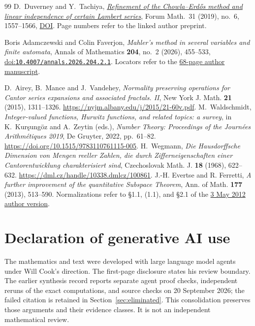 \documentclass[11pt]{article}
\begin{document}
\begin{thebibliography}{99}
 D.~Duverney and Y.~Tachiya,
  \href{https://danielduverney.fr/documents/theorie-des-nombres/DuverneyTachiya190522.pdf}
  {\emph{Refinement of the Chowla--Erd\H{o}s method and linear independence
  of certain Lambert series}},
  Forum Math.\ 31 (2019), no.~6, 1557--1566,
  \href{https://doi.org/10.1515/forum-2018-0299}{DOI}.  Page numbers refer to
  the linked author preprint.

 Boris Adamczewski and Colin Faverjon,
  \emph{Mahler's method in several variables and finite automata},
  Annals of Mathematics \textbf{204}, no.~2 (2026), 455--533,
  \href{https://doi.org/10.4007/annals.2026.204.2.1}{doi:\nolinkurl{10.4007/annals.2026.204.2.1}}.
  Locators refer to the
  \href{https://faverjon.perso.math.cnrs.fr/AdamczewskiFaverjon_MahlerFiniteAutomata.pdf}{68-page author manuscript}.

 D.~Airey, B.~Mance and J.~Vandehey,
\emph{Normality preserving operations for Cantor series expansions and
associated fractals. II}, New York J. Math. \textbf{21} (2015), 1311--1326.
\url{https://nyjm.albany.edu/j/2015/21-60v.pdf}.
 M.~Waldschmidt,
\emph{Integer-valued functions, Hurwitz functions, and related topics: a survey},
in K.~Kur\c{s}ung\"oz and A.~Zeytin (eds.), \emph{Number Theory: Proceedings
of the Journ\'ees Arithm\'etiques 2019}, De Gruyter, 2022, pp.~61--82.
\url{https://doi.org/10.1515/9783110761115-005}.
 H.~Wegmann,
\emph{Die Hausdorffsche Dimension von Mengen reeller Zahlen, die durch
Zifferneigenschaften einer Cantorentwicklung charakterisiert sind},
Czechoslovak Math. J. \textbf{18} (1968), 622--632.
\url{https://dml.cz/handle/10338.dmlcz/100861}.
 J.-H. Evertse and R. Ferretti,
  \emph{A further improvement of the quantitative Subspace Theorem},
  Ann. of Math. \textbf{177} (2013), 513--590.
  Normalizations refer to \S1.1, (1.1), and \S2.1 of the
  \href{https://pub.math.leidenuniv.nl/~evertsejh/10-subspace.pdf}{3 May 2012 author version}.

\end{thebibliography}

\section*{Declaration of generative AI use}
The mathematics and text were developed with large language model agents
under Will Cook's direction. The first-page disclosure states his review
boundary. The earlier synthesis record reports separate agent proof checks,
independent reruns of the exact computations, and source checks on 20 September
2026; the failed citation is retained in Section~\ref{sec:eliminated}.
This consolidation preserves those arguments and their evidence classes.
It is not an independent mathematical review.
\end{document}
